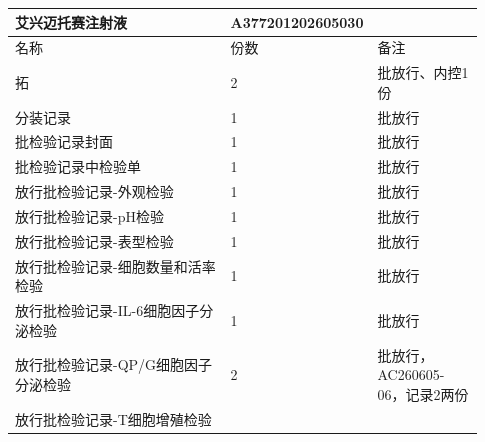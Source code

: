 \documentclass[UTF8,10pt,a4paper,fontset=fandol]{ctexart}
\newcommand{\fieldvalue}[1]{#1}
\begin{document}
\begin{center}
\scriptsize
\begin{tabular}{|p{0.61\linewidth}|p{0.07\linewidth}|p{0.25\linewidth}|}
\hline
艾兴迈托赛注射液 &
\fieldvalue{A377201202605030} & \\ \hline
名称 & 份数 & 备注 \\ \hline
拓 & 
\fieldvalue{2} &
\fieldvalue{批放行、内控1份} \\ \hline
分装记录 &
\fieldvalue{1} &
\fieldvalue{批放行} \\ \hline
批检验记录封面 &
\fieldvalue{1} &
\fieldvalue{批放行} \\ \hline
批检验记录中检验单 &
\fieldvalue{1} &
\fieldvalue{批放行} \\ \hline
放行批检验记录-外观检验 &
\fieldvalue{1} &
\fieldvalue{批放行} \\ \hline
放行批检验记录-pH检验 &
\fieldvalue{1} &
\fieldvalue{批放行} \\ \hline
放行批检验记录-表型检验 &
\fieldvalue{1} &
\fieldvalue{批放行} \\ \hline
放行批检验记录-细胞数量和活率检验 &
\fieldvalue{1} &
\fieldvalue{批放行} \\ \hline
放行批检验记录-IL-6细胞因子分泌检验 &
\fieldvalue{1} &
\fieldvalue{批放行} \\ \hline
放行批检验记录-QP/G细胞因子分泌检验 &
\fieldvalue{2} &
\fieldvalue{批放行，AC260605-06，记录2两份} \\ \hline
放行批检验记录-T细胞增殖检验 &

\end{tabular}
\end{center}
\end{document}
